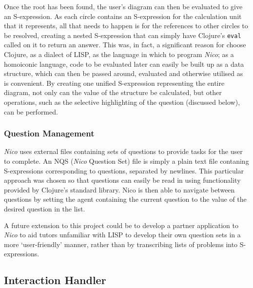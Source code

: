 \documentclass[12pt,twoside,notitlepage,xetex]{report}
\begin{document}
Once the root has been found, the user's diagram can then be evaluated to give an S-expression.  As each circle contains an S-expression for the calculation unit that it represents, all that needs to happen is for the references to other circles to be resolved, creating a nested S-expression that can simply have Clojure's \verb¬eval¬ called on it to return an answer.  This was, in fact, a significant reason for choose Clojure, as a dialect of LISP, as the language in which to program \emph{Nico}; as a homoiconic language, code to be evaluated later can easily be built up as a data structure, which can then be passed around, evaluated and otherwise utilised as is convenient.  By creating one unified S-expression representing the entire diagram, not only can the value of the structure be calculated, but other operations, such as the selective highlighting of the question (discussed below), can be performed.

\subsubsection{Question Management}

\emph{Nico} uses external files containing sets of questions to provide tasks for the user to complete.  An NQS (\emph{Nico} Question Set) file is simply a plain text file contaning S-expressions corresponding to questions, separated by newlines.  This particular approach was chosen so that questions can easily be read in using functionality provided by Clojure's standard library.  Nico is then able to navigate between questions by setting the agent containing the current question to the value of the desired question in the list.

A future extension to this project could be to develop a partner application to \emph{Nico} to aid tutors unfamiliar with LISP to develop their own question sets in a more `user-friendly' manner, rather than by transcribing lists of problems into S-expressions.

\subsection{Interaction Handler}
%
\end{document}
